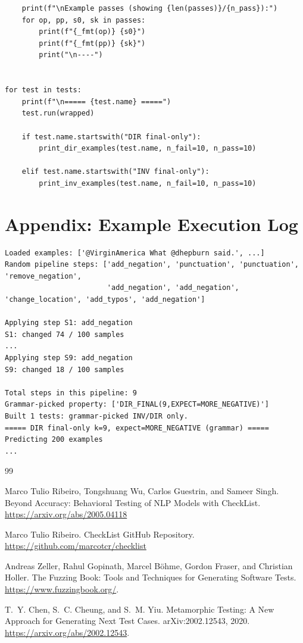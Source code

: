 \documentclass[11pt]{article}
\begin{document}
\begin{lstlisting}
    print(f"\nExample passes (showing {len(passes)}/{n_pass}):")
    for op, pp, s0, sk in passes:
        print(f"{_fmt(op)} {s0}")
        print(f"{_fmt(pp)} {sk}")
        print("\n----")


for test in tests:
    print(f"\n===== {test.name} =====")
    test.run(wrapped)

    if test.name.startswith("DIR final-only"):
        print_dir_examples(test.name, n_fail=10, n_pass=10)

    elif test.name.startswith("INV final-only"):
        print_inv_examples(test.name, n_fail=10, n_pass=10)
\end{lstlisting}

\newpage

\section{Appendix: Example Execution Log}
\label{app:log}

\lstset{style=mytext}
\begin{lstlisting}
Loaded examples: ['@VirginAmerica What @dhepburn said.', ...]
Random pipeline steps: ['add_negation', 'punctuation', 'punctuation', 'remove_negation',
                        'add_negation', 'add_negation', 'change_location', 'add_typos', 'add_negation']

Applying step S1: add_negation
S1: changed 74 / 100 samples
...
Applying step S9: add_negation
S9: changed 18 / 100 samples

Total steps in this pipeline: 9
Grammar-picked property: ['DIR_FINAL(9,EXPECT=MORE_NEGATIVE)']
Built 1 tests: grammar-picked INV/DIR only.
===== DIR final-only k=9, expect=MORE_NEGATIVE (grammar) =====
Predicting 200 examples
...
\end{lstlisting}




\begin{thebibliography}{99}

Marco Tulio Ribeiro, Tongshuang Wu, Carlos Guestrin, and Sameer Singh.
\newblock Beyond Accuracy: Behavioral Testing of NLP Models with CheckList.
\newblock  \url{https://arxiv.org/abs/2005.04118}

Marco Tulio Ribeiro.
\newblock CheckList GitHub Repository.
\newblock \url{https://github.com/marcotcr/checklist}

Andreas Zeller, Rahul Gopinath, Marcel B\"ohme, Gordon Fraser, and Christian Holler.
\newblock The Fuzzing Book: Tools and Techniques for Generating Software Tests.
\newblock \url{https://www.fuzzingbook.org/}.



T.~Y. Chen, S.~C. Cheung, and S.~M. Yiu.
\newblock Metamorphic Testing: A New Approach for Generating Next Test Cases.
\newblock arXiv:2002.12543, 2020.
\newblock \url{https://arxiv.org/abs/2002.12543}.

\end{thebibliography}
\end{document}
